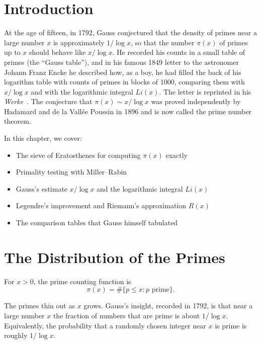 \section{Introduction}

At the age of fifteen, in 1792, Gauss conjectured that the density  of primes near a large number $x$ is approximately $1/\log x$, so that the number $\pi(x)$ of primes up to $x$ should behave like $x / \log x$. He recorded his counts in a small table of primes (the ``Gauss table''), and in his famous 1849 letter to the astronomer Johann Franz Encke he described how, as a boy, he had filled the back of his logarithm table with counts of primes in blocks of 1000, comparing them with $x/\log x$ and with the logarithmic integral $Li(x)$. The letter is reprinted in his \textit{Werke}~\cite{gauss-works}. The conjecture that $\pi(x) \sim x/\log x$ was proved independently by Hadamard and de la Vall\'ee Poussin in 1896 and is now called the prime number theorem.

In this chapter, we cover:
\begin{itemize}
    \item The sieve of Eratosthenes  for computing $\pi(x)$ exactly
    \item Primality testing with Miller--Rabin 
    \item Gauss's estimate $x/\log x$ and the logarithmic integral $Li(x)$
    \item Legendre's improvement and Riemann's approximation $R(x)$
    \item The comparison tables that Gauss himself tabulated
\end{itemize}

\section{The Distribution of the Primes}

\begin{definition}
For $x > 0$, the prime counting function is
\[
\pi(x) = \#\{p \le x : p \text{ prime}\}.
\]
\end{definition}

The primes thin out as $x$ grows. Gauss's insight, recorded in 1792, is that near a large number $x$ the fraction of numbers that are prime is about $1/\log x$. Equivalently, the probability that a randomly chosen integer near $x$ is prime is roughly $1/\log x$.


